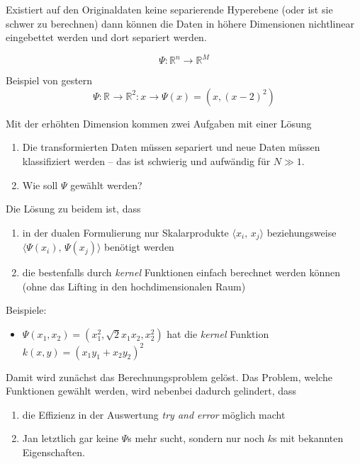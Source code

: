 \documentclass[
]{book}
\providecommand{\tightlist}{%
  \setlength{\itemsep}{0pt}\setlength{\parskip}{0pt}}
\theoremstyle{definition}
\theoremstyle{definition}
\theoremstyle{definition}
\theoremstyle{definition}
\theoremstyle{remark}
\begin{document}
Existiert auf den Originaldaten keine separierende Hyperebene (oder ist sie schwer zu berechnen) dann
können die Daten in höhere Dimensionen nichtlinear eingebettet werden
und dort separiert werden.

\begin{equation*}
\Psi \colon \mathbb R^{n} \to \mathbb R^{M}
\end{equation*}

Beispiel von gestern
\begin{equation*}
\Psi\colon \mathbb R^{} \to \mathbb R^{2}\colon x \to \Psi(x) = (x, (x-2)^2)
\end{equation*}

Mit der erhöhten Dimension kommen zwei Aufgaben mit einer Lösung

\begin{enumerate}
\def\labelenumi{\arabic{enumi}.}
\item
  Die transformierten Daten müssen separiert und neue Daten müssen
  klassifiziert werden -- das ist schwierig und aufwändig für \(N\gg 1\).
\item
  Wie soll \(\Psi\) gewählt werden?
\end{enumerate}

Die Lösung zu beidem ist, dass

\begin{enumerate}
\def\labelenumi{\arabic{enumi}.}
\tightlist
\item
  in der dualen Formulierung nur Skalarprodukte \(\bigl \langle x_i, \, x_j\bigr\rangle \)
  beziehungsweise \(\bigl \langle \Psi(x_i), \, \Psi(x_j)\bigr\rangle \) benötigt werden
\item
  die bestenfalls durch \emph{kernel} Funktionen einfach berechnet werden
  können (ohne das Lifting in den hochdimensionalen Raum)
\end{enumerate}

Beispiele:

\begin{itemize}
\tightlist
\item
  \(\Psi(x_1, x_2) = (x_1^2, \sqrt{2}x_1x_2, x_2^2)\) hat die \emph{kernel} Funktion
  \(k(x,y)=(x_1y_1+x_2y_2)^2\)
\end{itemize}

Damit wird zunächst das Berechnungsproblem gelöst. Das Problem, welche
Funktionen gewählt werden, wird nebenbei dadurch gelindert,
dass

\begin{enumerate}
\def\labelenumi{\arabic{enumi}.}
\tightlist
\item
  die Effizienz in der Auswertung \emph{try and error} möglich macht
\item
  Jan letztlich gar keine \(\Psi\)s mehr sucht, sondern nur noch \(k\)s mit
  bekannten Eigenschaften.
\end{enumerate}
\end{document}
